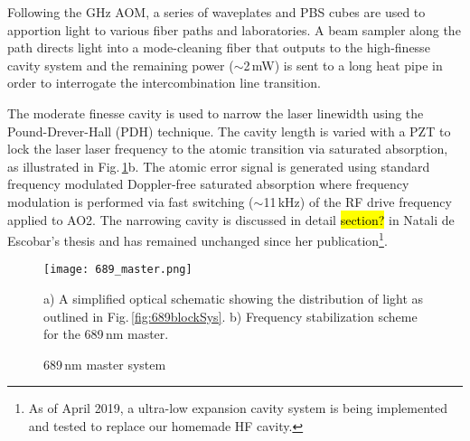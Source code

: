 Following the GHz AOM, a series of waveplates and PBS cubes are used to apportion light to various fiber paths and laboratories.
A beam sampler along the path directs light into a mode-cleaning fiber that outputs to the high-finesse cavity system and the remaining power ($\sim$2\,mW) is sent to a long heat pipe in order to interrogate the intercombination line transition.

The moderate finesse cavity is used to narrow the laser linewidth using the Pound-Drever-Hall (PDH) technique.
The cavity length is varied with a PZT to lock the laser laser frequency to the atomic transition via saturated absorption, as illustrated in Fig.\,\ref{fig:689master}b.
The atomic error signal is generated using standard frequency modulated Doppler-free saturated absorption where frequency modulation is performed via fast switching ($\sim$11\,kHz) of the RF drive frequency applied to AO2.
The narrowing cavity is discussed in detail \hl{section?} in Natali de Escobar's thesis and has remained unchanged since her publication\footnote{As of April 2019, a ultra-low expansion cavity system is being implemented and tested to replace our homemade HF cavity.}.
%
	\begin{figure} 
		\centerline{
		\texttt{[image: 689\_master.png]}}
		\caption{689\,nm master system}{a) A simplified optical schematic showing the distribution of light as outlined in Fig.\,\ref{fig:689blockSys}. b) Frequency stabilization scheme for the 689\,nm master.}
		\label{fig:689master}
	\end{figure}





